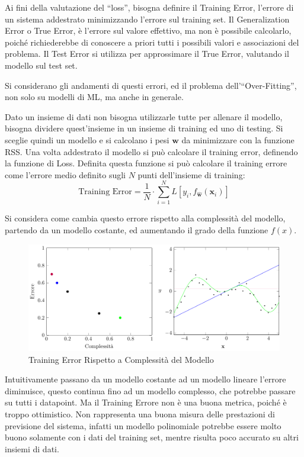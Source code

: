 \documentclass{article}
\numberwithin{equation}{subsection}
\newcommand{\vect}[1]{\boldsymbol{\mathbf{#1}}}
\begin{document}
Ai fini della valutazione del ``loss'', bisogna definire il Training Error, l'errore di 
un sistema addestrato minimizzando l'errore sul training set. 
Il Generalization Error o True Error, è l'errore sul valore effettivo, ma non è possibile 
calcolarlo, poiché richiederebbe di conoscere a priori tutti i possibili valori e associazioni del problema. Il Test Error si utilizza per approssimare il True Error, 
valutando il modello sul test set. 

Si considerano gli andamenti di questi errori, ed il problema dell'``Over-Fitting'', non solo su modelli di ML, ma anche in generale. 

Dato un insieme di dati non bisogna utilizzarle tutte per allenare il modello, bisogna 
dividere quest'insieme in un insieme di training ed uno di testing. Si sceglie quindi 
un modello e si calcolano i pesi $\vect{w}$ da minimizzare con la funzione RSS. 
Una volta addestrato il modello si può calcolare il training error, definendo la funzione di Loss. Definita questa funzione si può calcolare il training errore come l'errore medio definito sugli $N$ punti dell'insieme di training:
\begin{equation}
    \text{Training Error}=\displaystyle\frac{1}{N}\cdot\sum_{i=1}^NL[y_i,f_{\vect{\hat{w}}}(\vect{x}_i)]
\end{equation}

Si considera come cambia questo errore rispetto alla complessità del modello, partendo da un modello costante, ed aumentando il grado della funzione $f(x)$. 

\begin{figure}[H]%
    \centering%
    \includegraphics[scale=0.65]{training_error.pdf}%
    \caption{Training Error Rispetto a Complessità del Modello}%
\end{figure}

Intuitivamente passano da un modello costante ad un modello lineare l'errore diminuisce, 
questo continua fino ad un modello complesso, che potrebbe passare su tutti i datapoint. 
Ma il Training Errore non è una buona metrica, poiché è troppo ottimistico. Non rappresenta una buona misura delle prestazioni di previsione del sistema, infatti un modello polinomiale potrebbe essere molto buono solamente con i dati del training set, mentre risulta 
poco accurato su altri insiemi di dati. 
\end{document}
